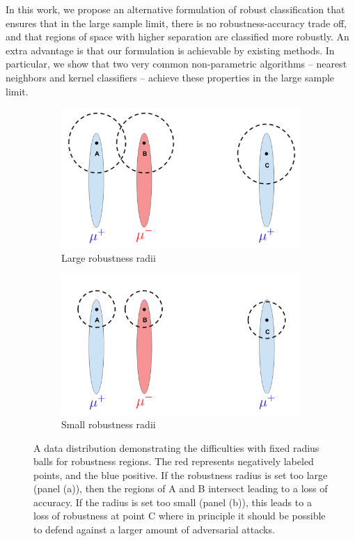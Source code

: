 In this work, we propose an alternative formulation of robust classification that ensures that in the large sample limit, there is no robustness-accuracy trade off, and that regions of space with higher separation are classified more robustly. An extra advantage is that our formulation is achievable by existing methods. In particular, we show that two very common non-parametric algorithms -- nearest neighbors and kernel classifiers -- achieve these properties in the large sample limit.


\begin{figure}
\begin{subfigure}{0.45\textwidth}
\includegraphics[width=\linewidth]{big_radius_robustness.png}
\caption{Large robustness radii} 
\end{subfigure}\hspace*{\fill}
\begin{subfigure}{0.45\textwidth}
\includegraphics[width=\linewidth]{small_radius_robustness.png}
\caption{Small robustness radii} 
\end{subfigure}

\caption{A data distribution demonstrating the difficulties with fixed radius balls for robustness regions. The red represents negatively labeled points, and the blue positive. If the robustness radius is set too large (panel (a)), then the regions of A and B intersect leading to a loss of accuracy. If the radius is set too small (panel (b)), this leads to a loss of robustness at point C where in principle it should be possible to defend against a larger amount of adversarial attacks.}\label{fig:intro}
\end{figure}

